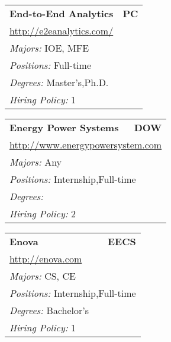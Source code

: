 \documentclass[twoside]{article}
\begin{document}
\begin{center}
\begin{multicols}{3}
\begin{FlushLeft}
\begin{minipage}{\columnwidth}
\end{minipage}
 
\begin{minipage}{\columnwidth}\begin{tabularx}{.95\columnwidth}{Xr}
                 {\Large\bf End-to-End Analytics} & {\Large\bf PC}\\
    \multicolumn{2}{p{.95\columnwidth}}{\url{http://e2eanalytics.com/}}\\
    \multicolumn{2}{p{.95\columnwidth}}{\emph{Majors:} IOE, MFE}\\
    \multicolumn{2}{p{.95\columnwidth}}{\emph{Positions:} Full-time}\\
    \multicolumn{2}{p{.95\columnwidth}}{\emph{Degrees:} Master's,Ph.D.}\\
    \multicolumn{2}{p{.95\columnwidth}}{\emph{Hiring Policy:} 1}\\
    \end{tabularx}
    
\end{minipage}
 
\begin{minipage}{\columnwidth}\begin{tabularx}{.95\columnwidth}{Xr}
                 {\Large\bf Energy Power Systems} & {\Large\bf DOW}\\
    \multicolumn{2}{p{.95\columnwidth}}{\url{http://www.energypowersystem.com}}\\
    \multicolumn{2}{p{.95\columnwidth}}{\emph{Majors:} Any}\\
    \multicolumn{2}{p{.95\columnwidth}}{\emph{Positions:} Internship,Full-time}\\
    \multicolumn{2}{p{.95\columnwidth}}{\emph{Degrees:} }\\
    \multicolumn{2}{p{.95\columnwidth}}{\emph{Hiring Policy:} 2}\\
    \end{tabularx}
    
\end{minipage}
 
\begin{minipage}{\columnwidth}\begin{tabularx}{.95\columnwidth}{Xr}
                 {\Large\bf Enova} & {\Large\bf EECS}\\
    \multicolumn{2}{p{.95\columnwidth}}{\url{http://enova.com}}\\
    \multicolumn{2}{p{.95\columnwidth}}{\emph{Majors:} CS, CE}\\
    \multicolumn{2}{p{.95\columnwidth}}{\emph{Positions:} Internship,Full-time}\\
    \multicolumn{2}{p{.95\columnwidth}}{\emph{Degrees:} Bachelor's}\\
    \multicolumn{2}{p{.95\columnwidth}}{\emph{Hiring Policy:} 1}\\
    \end{tabularx}
    

\end{minipage}
\end{FlushLeft}
\end{multicols}
\end{center}
\end{document}
